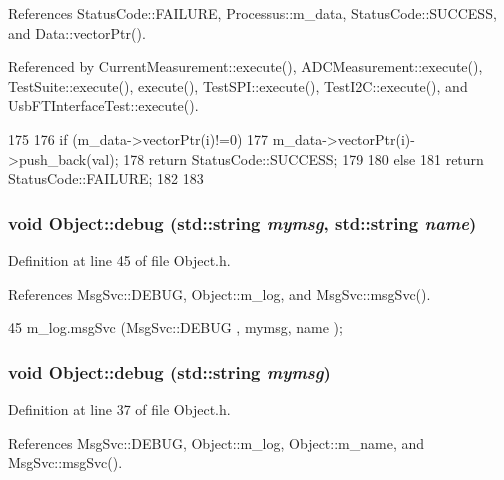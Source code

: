 References StatusCode::FAILURE, Processus::m\_\-data, StatusCode::SUCCESS, and Data::vectorPtr().

Referenced by CurrentMeasurement::execute(), ADCMeasurement::execute(), TestSuite::execute(), execute(), TestSPI::execute(), TestI2C::execute(), and UsbFTInterfaceTest::execute().


\begin{DoxyCode}
175                                         {
176     if (m_data->vectorPtr(i)!=0){
177       m_data->vectorPtr(i)->push_back(val);
178       return StatusCode::SUCCESS;
179     }
180     else {
181       return StatusCode::FAILURE;
182     }
183   }
\end{DoxyCode}
\hypertarget{classObject_a6c9a0397ca804e04d675ed05683f5420}{
\subsubsection[{debug}]{\setlength{\rightskip}{0pt plus 5cm}void Object::debug (std::string {\em mymsg}, \/  std::string {\em name})}}
\label{classObject_a6c9a0397ca804e04d675ed05683f5420}


Definition at line 45 of file Object.h.

References MsgSvc::DEBUG, Object::m\_\-log, and MsgSvc::msgSvc().


\begin{DoxyCode}
45 { m_log.msgSvc (MsgSvc::DEBUG   , mymsg, name ); }
\end{DoxyCode}
\hypertarget{classObject_aac010553f022165573714b7014a15f0d}{
\subsubsection[{debug}]{\setlength{\rightskip}{0pt plus 5cm}void Object::debug (std::string {\em mymsg})}}
\label{classObject_aac010553f022165573714b7014a15f0d}


Definition at line 37 of file Object.h.

References MsgSvc::DEBUG, Object::m\_\-log, Object::m\_\-name, and MsgSvc::msgSvc().

